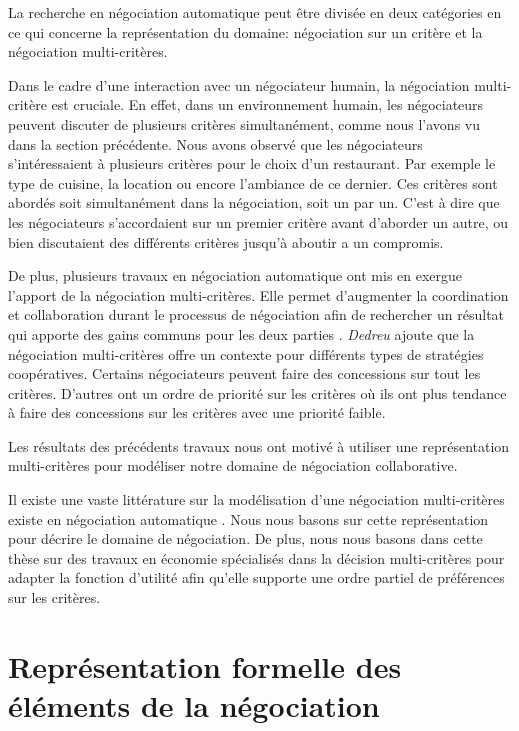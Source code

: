 		La recherche en négociation automatique peut être divisée en deux catégories en ce qui concerne la représentation du domaine: négociation sur un critère et la négociation multi-critères.  
		
		Dans le cadre d'une interaction avec un négociateur humain, la négociation multi-critère est cruciale. En effet, dans un environnement humain, les négociateurs peuvent discuter de plusieurs critères simultanément, comme nous l'avons vu dans la section précédente.  Nous avons observé que les négociateurs s'intéressaient à plusieurs critères pour le choix d'un restaurant. Par exemple le type de cuisine, la location ou encore l'ambiance de ce dernier. Ces critères sont abordés soit simultanément dans la négociation, soit un par un. C'est à dire que les négociateurs s'accordaient sur un premier critère avant d'aborder un autre, ou bien discutaient des différents critères jusqu'à aboutir a un compromis.
		
		De plus, plusieurs travaux en négociation automatique ont mis en exergue l'apport de la négociation multi-critères. Elle permet d'augmenter la coordination et collaboration durant le processus de négociation afin de rechercher un résultat qui apporte des gains communs pour les deux parties \cite{jonker2007agent,lai2008decentralized,lai2004literature}. \emph{Dedreu} \cite{de1995impact} ajoute que la négociation multi-critères offre un contexte pour différents types de stratégies coopératives. Certains négociateurs peuvent faire des concessions sur tout les critères. D'autres ont un ordre de priorité sur les critères où ils ont plus tendance à faire des concessions sur les critères avec une priorité faible. 
	
		Les résultats des précédents travaux nous ont motivé à utiliser une représentation multi-critères pour modéliser notre domaine de négociation collaborative. 
		
		Il existe une vaste littérature sur la modélisation d'une négociation multi-critères existe en négociation automatique \cite{jonker2007agent,lai2008decentralized,lai2004literature,hindriks2008opponent,traum2008multi}. Nous nous basons sur cette représentation pour décrire le domaine de négociation.
		De plus, nous nous basons dans cette thèse sur des travaux en économie spécialisés dans la décision multi-critères \cite{greco2016multiple} pour adapter la fonction d'utilité afin qu'elle supporte une ordre partiel de préférences sur les critères.
		
		
		\section{Représentation formelle des éléments de la négociation}
			
